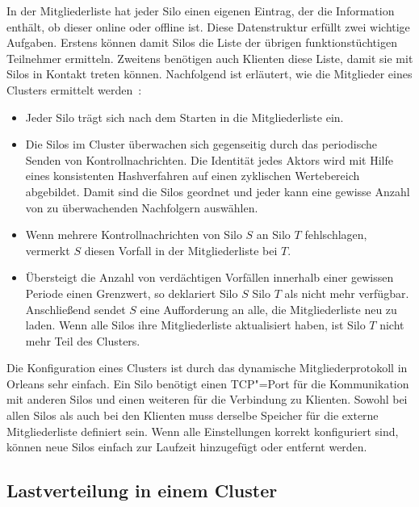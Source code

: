 In der Mitgliederliste hat jeder Silo einen eigenen Eintrag, der \zB die Information enthält, ob dieser online oder offline ist. Diese Datenstruktur erfüllt zwei wichtige Aufgaben. Erstens können damit Silos die Liste der übrigen funktionstüchtigen Teilnehmer ermitteln. Zweitens benötigen auch Klienten diese Liste, damit sie mit Silos in Kontakt treten können. Nachfolgend ist erläutert, wie die Mitglieder eines Clusters ermittelt werden~\cite{Bernstein2014}:

\begin{itemize}
	\item Jeder Silo trägt sich nach dem Starten in die Mitgliederliste ein.
	\item Die Silos im Cluster überwachen sich gegenseitig durch das periodische Senden von Kontrollnachrichten. Die Identität jedes Aktors wird mit Hilfe eines konsistenten Hashverfahren auf einen zyklischen Wertebereich abgebildet. Damit sind die Silos geordnet und jeder kann eine gewisse Anzahl von zu überwachenden Nachfolgern auswählen.
	\item Wenn mehrere Kontrollnachrichten von Silo $S$ an Silo $T$ fehlschlagen, vermerkt $S$ diesen Vorfall in der Mitgliederliste bei $T$.
	\item Übersteigt die Anzahl von verdächtigen Vorfällen innerhalb einer gewissen Periode einen Grenzwert, so deklariert Silo $S$ Silo $T$ als nicht mehr verfügbar. Anschließend sendet $S$ eine Aufforderung an alle, die Mitgliederliste neu zu laden. Wenn alle Silos ihre Mitgliederliste aktualisiert haben, ist Silo $T$ nicht mehr Teil des Clusters.
\end{itemize}

Die Konfiguration eines Clusters ist durch das dynamische Mitgliederprotokoll in Orleans sehr einfach. Ein Silo benötigt einen TCP"=Port für die Kommunikation mit anderen Silos und einen weiteren für die Verbindung zu Klienten. Sowohl bei allen Silos als auch bei den Klienten muss derselbe Speicher für die externe Mitgliederliste definiert sein. Wenn alle Einstellungen korrekt konfiguriert sind, können neue Silos einfach zur Laufzeit hinzugefügt oder entfernt werden.

\subsection{Lastverteilung in einem Cluster}


